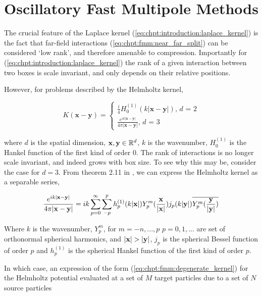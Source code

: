 
\section{Oscillatory Fast Multipole Methods}\label{chpt:fmm:sec:oscillatory}

The crucial feature of the Laplace kernel (\ref{eq:chpt:introduction:laplace_kernel}) is the fact that far-field interactions (\ref{eq:chpt:fmm:near_far_split}) can be considered `low rank', and therefore amenable to compression. Importantly for (\ref{eq:chpt:introduction:laplace_kernel}) the rank of a given interaction between two boxes is scale invariant, and only depends on their relative positions.

However, for problems described by the Helmholtz kernel,

\begin{equation}
    K(\mathbf{x-y}) = \begin{cases}
        \frac{i}{4} H_0^{(1)}(k |\mathbf{x-y}|)  \text{, $d$ = 2}\\
         \frac{e^{ik |\mathbf{x-y}|}}{4\pi |\mathbf{x-y}|}  \text{, $d$ = 3}
    \end{cases}
    \label{eq:chpt:fmm:helmholtz_kernel}
\end{equation}

where $d$ is the spatial dimension, $\mathbf{x}, \mathbf{y} \in \mathbb{R}^d$, $k$ is the wavenumber, $H_0^{(1)}$ is the Hankel function of the first kind of order 0. The rank of interactions is no longer scale invariant, and indeed grows with box size. To see why this may be, consider the case for $d=3$. From theorem 2.11 in \cite{colton1998inverse}, we can express the Helmholtz kernel as a separable series,

\begin{equation}
    \frac{e^{ik|\mathbf{x} - \mathbf{y}|}}{4\pi |\mathbf{x} - \mathbf{y}|} = ik \sum_{p=0}^\infty \sum_{-p}^p h_p^{(1)}(k|\mathbf{x}|) Y_p^m(\frac{\mathbf{x}}{|\mathbf{x}|})j_p(k|\mathbf{y}|) \overline{Y_p^m(\frac{\mathbf{y}}{|\mathbf{y}|})}
\end{equation}

Where $k$ is the wavenumber, $Y_p^m$, for $m=-n,...,p$ $p=0,1,...$ are set of orthonormal spherical harmonics, and $|\mathbf{x}| > |\mathbf{y}|$, $j_p$ is the spherical Bessel function of order $p$ and $h_p^{(1)}$ is the spherical Hankel function of the first kind of order $p$.

In which case, an expression of the form (\ref{eq:chpt:fmm:degenerate_kernel}) for the Helmholtz potential evaluated at a set of $M$ target particles due to a set of $N$ source particles

